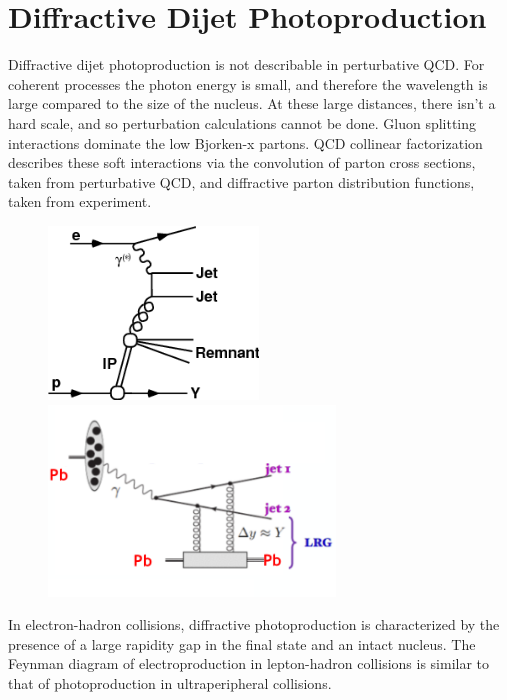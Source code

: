
\chapter{Diffractive Dijet Photoproduction}

Diffractive dijet photoproduction is not describable in perturbative QCD. For coherent processes the photon energy is small, and therefore the wavelength is large compared to the size of the nucleus. At these large distances, there isn't a hard scale, and so perturbation calculations cannot be done. Gluon splitting interactions dominate the low Bjorken-x partons. QCD collinear factorization describes these soft interactions via the convolution of parton cross sections, taken from perturbative QCD, and diffractive parton distribution functions, taken from experiment. 

\begin{figure}[h!]
\begin{centering}
\includegraphics[width=2.2in]{Chapter2/importfigs/fig1a.png}
\includegraphics[width=3in]{Chapter2/importfigs/fig3_daniel_upc.png}
\par\end{centering}
\end{figure}

In electron-hadron collisions, diffractive photoproduction is characterized by the presence of a large rapidity gap in the final state and an intact nucleus. The Feynman diagram of electroproduction in lepton-hadron collisions is similar to that of photoproduction in ultraperipheral collisions.

